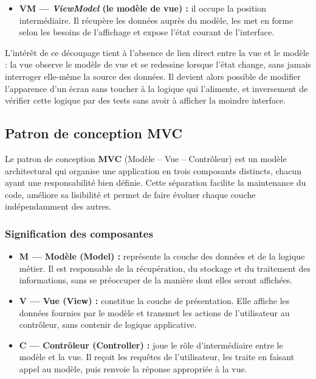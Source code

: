 \documentclass[12pt,fleqn,a4paper]{report}
\begin{document}
\begin{justify}
\begin{itemize}
    \item \textbf{VM --- \textit{ViewModel} (le modèle de vue) :} il occupe la
    position intermédiaire. Il récupère les données auprès du modèle, les met
    en forme selon les besoins de l'affichage et expose l'état courant de
    l'interface.
\end{itemize}

L'intérêt de ce découpage tient à l'absence de lien direct entre la vue et le
modèle : la vue observe le modèle de vue et se redessine lorsque l'état
change, sans jamais interroger elle-même la source des données. Il devient
alors possible de modifier l'apparence d'un écran sans toucher à la logique
qui l'alimente, et inversement de vérifier cette logique par des tests sans
avoir à afficher la moindre interface.

\subsection{Patron de conception MVC}

Le patron de conception \textbf{MVC} (Modèle -- Vue -- Contrôleur) est un
modèle architectural qui organise une application en trois composants
distincts, chacun ayant une responsabilité bien définie. Cette séparation
facilite la maintenance du code, améliore sa lisibilité et permet de faire
évoluer chaque couche indépendamment des autres.

\subsubsection{Signification des composantes}

\begin{itemize}
    \item \textbf{M — Modèle (Model) :} représente la couche des données
    et de la logique métier. Il est responsable de la récupération, du
    stockage et du traitement des informations, sans se préoccuper de
    la manière dont elles seront affichées.

    \item \textbf{V — Vue (View) :} constitue la couche de présentation.
    Elle affiche les données fournies par le modèle et transmet les
    actions de l'utilisateur au contrôleur, sans contenir de logique
    applicative.

    \item \textbf{C — Contrôleur (Controller) :} joue le rôle
    d'intermédiaire entre le modèle et la vue. Il reçoit les requêtes
    de l'utilisateur, les traite en faisant appel au modèle, puis
    renvoie la réponse appropriée à la vue.
\end{itemize}


\end{justify}
\end{document}
